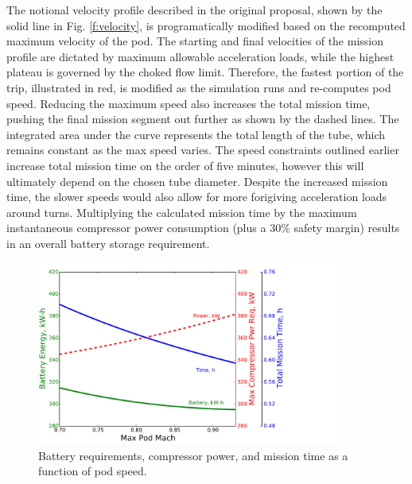 \documentclass[heading.tex]{subfiles}
\begin{document}
The notional velocity profile described in the original proposal, shown by the solid line in Fig. \ref{f:velocity},
is programatically modified based on the recomputed maximum velocity of the pod. The starting and final velocities of the
mission profile are dictated by maximum allowable acceleration loads, while the highest plateau is governed by the
choked flow limit. Therefore, the fastest portion of the trip, illustrated in red, is modified as the simulation runs and re-computes pod speed.
Reducing the maximum speed also increases the total mission time,
pushing the final mission segment out further as shown by the dashed lines.
The integrated area under the curve represents the total length of the tube, which remains constant as the max speed varies.
The speed constraints outlined earlier increase total mission time on the order of five minutes,
however this will ultimately depend on the chosen tube diameter.
Despite the increased mission time, the slower speeds would also allow for more forigiving acceleration loads around turns.
Multiplying the calculated mission time by the maximum instantaneous compressor power consumption (plus a 30\% safety margin)
results in an overall battery storage requirement.

\begin{figure}[hbtp]
\centering
\includegraphics[width=0.9\textwidth]{images/battery_plot.pdf}
\caption[Battery/Compressor/Mission requirements as a function of pod speed]
{Battery requirements, compressor power, and mission time as a function of pod speed.}
\label{f:battery}
\end{figure}
\end{document}
